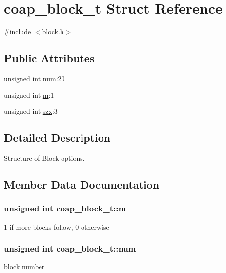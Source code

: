 \hypertarget{structcoap__block__t}{}\section{coap\+\_\+block\+\_\+t Struct Reference}
\label{structcoap__block__t}


{\ttfamily \#include $<$block.\+h$>$}

\subsection*{Public Attributes}
\begin{DoxyCompactItemize}
\item 
unsigned int \hyperlink{structcoap__block__t_a601d49b58bb18aa216e7bc5410076af9}{num}\+:20
\item 
unsigned int \hyperlink{structcoap__block__t_ab853b0f192d874e5c0fc5d054348731d}{m}\+:1
\item 
unsigned int \hyperlink{structcoap__block__t_aaeb4409b7a94cc0de61ea7657996d329}{szx}\+:3
\end{DoxyCompactItemize}


\subsection{Detailed Description}
Structure of Block options. 

\subsection{Member Data Documentation}
\hypertarget{structcoap__block__t_ab853b0f192d874e5c0fc5d054348731d}{}
\subsubsection[{m}]{\setlength{\rightskip}{0pt plus 5cm}unsigned int coap\+\_\+block\+\_\+t\+::m}\label{structcoap__block__t_ab853b0f192d874e5c0fc5d054348731d}
1 if more blocks follow, 0 otherwise \hypertarget{structcoap__block__t_a601d49b58bb18aa216e7bc5410076af9}{}
\subsubsection[{num}]{\setlength{\rightskip}{0pt plus 5cm}unsigned int coap\+\_\+block\+\_\+t\+::num}\label{structcoap__block__t_a601d49b58bb18aa216e7bc5410076af9}
block number \hypertarget{structcoap__block__t_aaeb4409b7a94cc0de61ea7657996d329}{}
